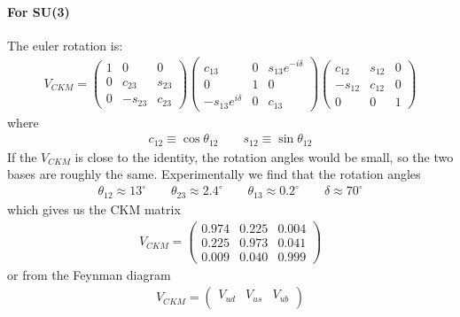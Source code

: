 \documentclass[../main.tex]{subfiles}
\begin{document}
\begin{itemize}
    \paragraph*{For SU(3)} The euler rotation is:
    \begin{align*}
        V_{CKM} = \begin{pmatrix}
            1 & 0 & 0 \\
            0 & c_{23} & s_{23} \\
            0 & -s_{23} & c_{23}
        \end{pmatrix}
        \begin{pmatrix}
            c_{13} & 0 & s_{13}e^{-i\delta} \\
            0 & 1 & 0 \\
            -s_{13}e^{i\delta} & 0 & c_{13}
        \end{pmatrix}
        \begin{pmatrix}
            c_{12} & s_{12} & 0 \\
            -s_{12} & c_{12} & 0 \\
            0 & 0 & 1
        \end{pmatrix}
    \end{align*}
    where 
    \begin{align*}
        c_{12} \equiv \cos \theta_{12} \qquad s_{12} \equiv \sin \theta_{12}
    \end{align*}
    If the $V_{CKM}$ is close to the identity, the rotation angles would be small, so the two bases
    are roughly the same. Experimentally we find that the rotation angles
    \begin{align*}
        \theta_{12} \approx 13^\circ \qquad \theta_{23} \approx 2.4^\circ \qquad \theta_{13} \approx
        0.2^\circ \qquad \delta \approx 70^\circ
    \end{align*}
    which gives us the CKM matrix
    \begin{align*}
        V_{CKM} = \begin{pmatrix}
            0.974 & 0.225 & 0.004 \\
            0.225 & 0.973 & 0.041 \\
            0.009 & 0.040 & 0.999
        \end{pmatrix}
    \end{align*}
    or from the Feynman diagram
    \begin{align*}
        V_{CKM} = \begin{pmatrix}
            V_{ud} & V_{us} & V_{ub} \\

\end{pmatrix}
\end{align*}
\end{itemize}
\end{document}
